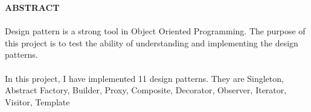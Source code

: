 \begin{center}
\thispagestyle{empty}
\vspace{2cm}
\LARGE{\textbf{ABSTRACT}}\\[1.0cm]
\end{center}
\thispagestyle{empty}
\large{\paragraph{}
Design pattern is a strong tool in Object Oriented Programming. The purpose of this project is to test the ability of understanding and implementing the design patterns. 
}
\large{\paragraph{}
In this project, I have implemented 11 design patterns. They are Singleton, Abstract Factory, Builder, Proxy, Composite, Decorator, Observer, Iterator, Visitor, Template
}\\